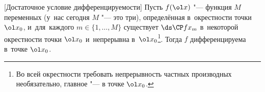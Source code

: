 [Достаточное условие дифференцируемости]
	 Пусть $f(\ol x)$ "--- функция $M$ переменных (у~нас сегодня $M$ "--- это три), определённая в~окрестности точки $\ol x_0$, и~для~каждого $m\in\{1,\ldots,M\}$ 
	 существует $\ds\CP f{x_m}$ в~некоторой окрестности точки $\ol x_0$ и~непрерывна в~$\ol x_0$\footnote{Во всей окрестности требовать непрерывность частных производных необязательно, главное "--- в точке $\ol x_0$.}.
	 Тогда $f$ дифференцируема в~точке $\ol x_0$. 
	 